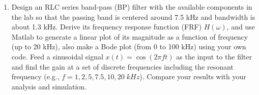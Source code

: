 \begin{enumerate}
\begin{comment}
  \item The FRF of the second circuit is
    \[
    H_R=\frac{R}{Z_{LC}+R}=\frac{R}{\frac{j\omega L}{1-(\omega/\omega_n)^2}+R}
    =\frac{1}{\frac{j\omega L/R}{1-(\omega/\omega_n)^2 }+1}
    \]
    when $\omega=\omega_n$, $Z_{LC}=\infty$, the LC parallel branch 
    is an open-circuit, the output voltage is zero. Otherwise either 
    $\omega>\omega_n$ or $\omega<\omega_n$, $Z_{LC}$ is finite, the
    voltage is non-zero. The circuit is a band-stop or band-block 
    filter:
    \[ 
    |H_{BS}|=\bigg|\frac{R}{R+Z_C||Z_L}\bigg|
    =\left\{\begin{array}{cc}1&\omega\rightarrow 0\\
    0&\omega=\omega_n\\ 1&\omega\rightarrow\infty\end{array}\right.
    \]

  \end{itemize}
  The bandwidth is defined as $\Delta\omega=\omega_2-\omega_1$, the
  difference between the two cut-off frequencies $\omega_1<\omega_n$ 
  and $\omega_2>\omega_n$ at which $|H|=1/\sqrt{2}$. For both filters,
  the cut-off frequencies can be found by solving
  \[
  1-\left(\frac{\omega}{\omega_n}\right)^2 =\pm \frac{\omega L}{R}
  \]
  i.e., the two filters always have the same bandwidth.

  \htmladdimg{../../lectures/figures/BpassBstop.png}

  Choose $C=1\,\mu F$ and $L=2\,mH$ so that 
  $f_n=1/(2\pi\sqrt{LC})=6.016\,kHz$, choose $R=150\Omega$ so that
  $\Delta f=1/(2\pi RC)=1.06\,kHz$. 
  
  The inductor has a non-zero resistance $R_L=7\,\Omega$, which
  caused the discrepancy between the simulation and the circuits.

  \end{comment}

\item Design an RLC series band-pass (BP) filter with the available components 
  in the lab so that the passing band is centered around 7.5 kHz and bandwidth
  is about 1.3 kHz. Derive its frequency response function (FRF) $H(\omega)$, 
  and use Matlab to generate a linear plot of its magnitude as a function of 
  frequency (up to 20 kHz), also make a Bode plot (from 0 to 100 kHz) using your
  own code. Feed 
  a sinusoidal signal $x(t)=\cos(2\pi ft)$ as the input to the filter and find the 
  gain at a set of discrete frequencies including the resonant frequency (e.g., $f=1, 
  2, 5, 7.5, 10, 20\; kHz$). Compare your results with your analysis and simulation.


\end{enumerate}
